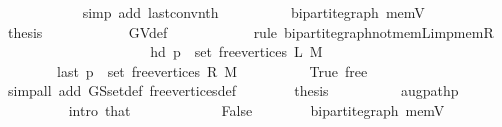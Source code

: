 \begin{isabellebody}
\ \ \ \ \ \ \ \ \ \ \isamarkupfalse%
\ {\isacharparenleft}{\kern0pt}simp\ add{\isacharcolon}{\kern0pt}\ last{\isacharunderscore}{\kern0pt}conv{\isacharunderscore}{\kern0pt}nth{\isacharparenright}{\kern0pt}\isanewline
\ \ \ \ \ \ \ \ \isamarkupfalse%
\ bipartite{\isacharunderscore}{\kern0pt}graph\ mem{\isacharunderscore}{\kern0pt}V{\isacharparenleft}{\kern0pt}{}{\isacharparenright}{\kern0pt}\isanewline
\ \ \ \ \ \ \ \ \isamarkupfalse%
\ {\isacharquery}{\kern0pt}thesis\isanewline
\ \ \ \ \ \ \ \ \ \ \isamarkupfalse%
\ G{\isachardot}{\kern0pt}V{\isacharunderscore}{\kern0pt}def\isanewline
\ \ \ \ \ \ \ \ \ \ \isamarkupfalse%
\ {\isacharparenleft}{\kern0pt}rule\ bipartite{\isacharunderscore}{\kern0pt}graph{\isachardot}{\kern0pt}not{\isacharunderscore}{\kern0pt}mem{\isacharunderscore}{\kern0pt}L{\isacharunderscore}{\kern0pt}imp{\isacharunderscore}{\kern0pt}mem{\isacharunderscore}{\kern0pt}R{\isacharparenright}{\kern0pt}\isanewline
\ \ \ \ \ \ \isamarkupfalse%
\isanewline
\ \ \ \ \ \ \isamarkupfalse%
\isanewline
\ \ \ \ \ \ \ \ {\isachardoublequoteopen}hd\ p\ {\isasymin}\ set\ {\isacharparenleft}{\kern0pt}free{\isacharunderscore}{\kern0pt}vertices\ L\ M{\isacharparenright}{\kern0pt}{\isachardoublequoteclose}\isanewline
\ \ \ \ \ \ \ \ {\isachardoublequoteopen}last\ p\ {\isasymin}\ set\ {\isacharparenleft}{\kern0pt}free{\isacharunderscore}{\kern0pt}vertices\ R\ M{\isacharparenright}{\kern0pt}{\isachardoublequoteclose}\isanewline
\ \ \ \ \ \ \ \ \isamarkupfalse%
\ True\ free\isanewline
\ \ \ \ \ \ \ \ \isamarkupfalse%
\ {\isacharparenleft}{\kern0pt}simp{\isacharunderscore}{\kern0pt}all\ add{\isacharcolon}{\kern0pt}\ G{\isachardot}{\kern0pt}S{\isachardot}{\kern0pt}set{\isacharunderscore}{\kern0pt}def\ free{\isacharunderscore}{\kern0pt}vertices{\isacharunderscore}{\kern0pt}def{\isacharparenright}{\kern0pt}\isanewline
\ \ \ \ \ \ \isamarkupfalse%
\ {\isacharquery}{\kern0pt}thesis\isanewline
\ \ \ \ \ \ \ \ \isamarkupfalse%
\ augpath{\isacharunderscore}{\kern0pt}p\isanewline
\ \ \ \ \ \ \ \ \isamarkupfalse%
\ {\isacharparenleft}{\kern0pt}intro\ that{\isacharparenright}{\kern0pt}\isanewline
\ \ \ \ \isamarkupfalse%
\isanewline
\ \ \ \ \ \ \isamarkupfalse%
\ False\isanewline
\ \ \ \ \ \ \isamarkupfalse%
\ bipartite{\isacharunderscore}{\kern0pt}graph\ mem{\isacharunderscore}{\kern0pt}V{\isacharparenleft}{\kern0pt}{}{\isacharparenright}{\kern0pt}\isanewline

\end{isabellebody}
